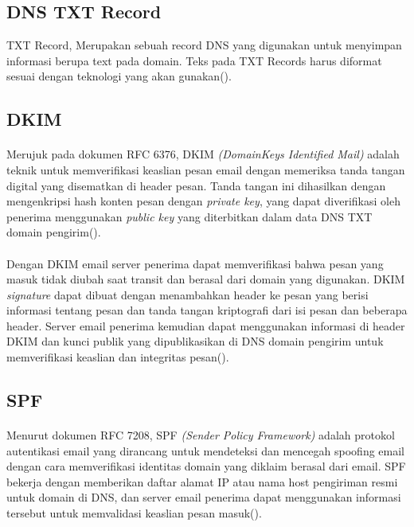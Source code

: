 \documentclass[./bab_2.tex]{subfiles}
\begin{document}
    \subsection{DNS TXT Record}
    TXT Record, Merupakan sebuah record DNS yang digunakan
    untuk menyimpan informasi berupa text pada domain. Teks
    pada TXT Records harus diformat sesuai dengan teknologi
    yang akan gunakan(\cite{rfc1464}).

    \subsection{DKIM}
    \paragraph*{} Merujuk pada dokumen RFC 6376, DKIM
    \textit{(DomainKeys Identified Mail)} adalah teknik untuk
    memverifikasi keaslian pesan email dengan memeriksa
    tanda tangan digital yang disematkan di header pesan.
    Tanda tangan ini dihasilkan dengan mengenkripsi hash
    konten pesan dengan \textit{private key}, yang dapat
    diverifikasi oleh penerima menggunakan \textit{public
    key} yang diterbitkan dalam data DNS TXT domain
    pengirim(\cite{rfc6376}).

    \paragraph*{} Dengan DKIM email server penerima dapat
    memverifikasi bahwa pesan yang masuk tidak diubah
    saat transit dan berasal dari domain yang digunakan.
    DKIM \textit{signature} dapat dibuat dengan menambahkan
    header ke pesan yang berisi informasi tentang pesan dan
    tanda tangan kriptografi dari isi pesan dan beberapa
    header. Server email penerima kemudian dapat menggunakan
    informasi di header DKIM dan kunci publik yang
    dipublikasikan di DNS domain pengirim untuk
    memverifikasi keaslian dan integritas pesan(\cite{rfc6376}).

    \subsection{SPF}
    \paragraph*{} Menurut dokumen RFC 7208, SPF \textit{(Sender
    Policy Framework)} adalah protokol autentikasi email yang
    dirancang untuk mendeteksi dan mencegah spoofing email
    dengan cara memverifikasi identitas domain yang diklaim
    berasal dari email. SPF bekerja dengan memberikan daftar
    alamat IP atau nama host pengiriman resmi untuk domain
    di DNS, dan server email penerima dapat menggunakan
    informasi tersebut untuk memvalidasi keaslian pesan
    masuk(\cite{rfc7208}).
\end{document}
